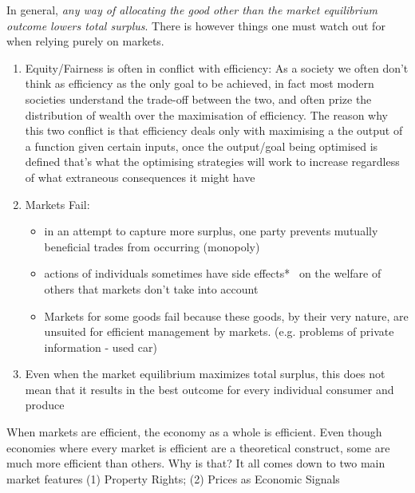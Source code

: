 \documentclass[english,course]{Notes}
\newcommand{\ita}[1]{\textit{#1}}
\begin{document}
\par{In general, \ita{any way of allocating the good other than the market equilibrium outcome lowers total surplus}. There is however things one must watch out for when relying purely on markets.}

\begin{enumerate}
	\item Equity/Fairness is often in conflict with efficiency: As a society we often don't think as efficiency as the only goal to be achieved, in fact most modern societies understand the trade-off between the two, and often prize the distribution of wealth over the maximisation of efficiency. The reason why this two conflict is that efficiency deals only with maximising a the output of a function given certain inputs, once the output/goal being optimised is defined that's what the optimising strategies will work to increase regardless of what extraneous consequences it might have
	
	\item Markets Fail: 
		\begin{itemize}
		\item in an attempt to capture more surplus, one party prevents mutually beneficial trades from occurring (monopoly)
		\item actions of individuals sometimes have side effects*~ on the welfare of others that markets don't take into account
		\item Markets for some goods fail because these goods, by their very nature, are unsuited for efficient management by markets. (e.g. problems of private information - used car)
		\end{itemize}
		
	\item Even when the market equilibrium maximizes total surplus, this does not mean that it results in the best outcome for every individual consumer and produce
\end{enumerate}

\par{When markets are efficient, the economy as a whole is efficient. Even though economies where every market is efficient are a theoretical construct, some are much more efficient than others. Why is that? It all comes down to two main market features (1) Property Rights; (2) Prices as Economic Signals }

\end{document}
